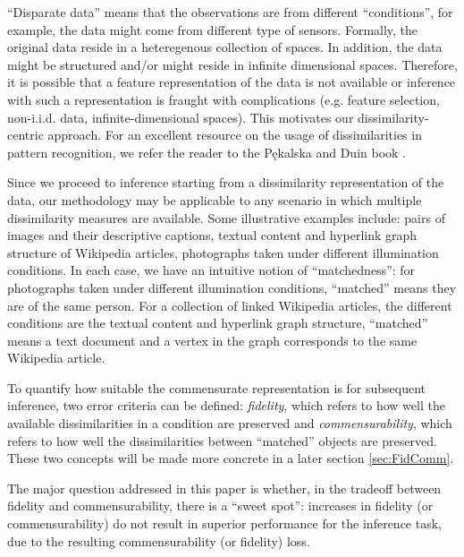 \documentclass[12pt]{article} %
\begin{document}
     ``Disparate data''  means that  the observations are from  different ``conditions'', for example, the data might come from different type of sensors. Formally, the original data  reside in a heteregenous collection of  spaces.  In addition, the data might be structured and/or might reside in  infinite dimensional spaces. Therefore, it is possible that a feature representation of the data is not available or inference with such a representation is fraught with complications (e.g. feature selection, non-i.i.d. data, infinite-dimensional spaces). This motivates our  dissimilarity-centric approach. For an excellent resource on the usage of dissimilarities in pattern recognition, we refer the reader to the P\k{e}kalska and Duin book \cite{duin2005dissimilarity}.
		
		Since we proceed to inference starting from a dissimilarity representation of the data, our methodology may be applicable to any scenario in which multiple dissimilarity measures are available.  Some illustrative examples include:  pairs of images and their descriptive captions,  textual content  and  hyperlink graph
structure of  Wikipedia  articles, photographs taken under different illumination conditions. In each case, we have an intuitive notion of ``matchedness'': for photographs taken under different illumination conditions, ``matched'' means they are of the same person. For a collection of linked Wikipedia articles, the different conditions  are  the textual content and hyperlink graph structure, ``matched'' means a text document and  a vertex  in the graph corresponds to the same Wikipedia article. 

    To quantify how suitable the commensurate representation is for subsequent inference, two error criteria can be defined: \emph{fidelity}, which refers to how well the available dissimilarities in a condition are preserved and \emph{commensurability}, which refers to how well the dissimilarities between ``matched'' objects are preserved. These two concepts will be made more concrete in a later section \ref{sec:FidComm}.

The major question  addressed in this paper is whether, in the tradeoff between fidelity and commensurability, there is a ``sweet spot'': increases in fidelity (or commensurability) do not result in superior performance for  the inference task, due to the resulting commensurability (or fidelity) loss. 
\end{document}
